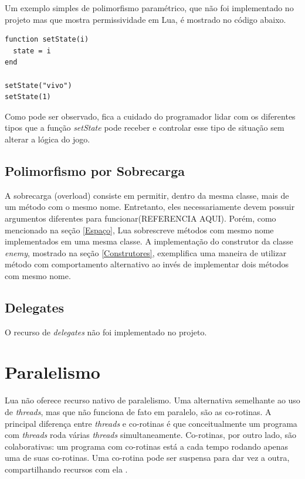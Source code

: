 \documentclass[rel_mlp]{iiufrgs}
\begin{document}
Um exemplo simples de polimorfismo paramétrico, que não foi implementado no projeto mas que mostra permissividade em Lua, é mostrado no código abaixo. 

\begin{lstlisting}
function setState(i)
  state = i
end

setState("vivo")
setState(1)
\end{lstlisting}

Como pode ser observado, fica a cuidado do programador lidar com os diferentes tipos que a função \textit{setState} pode receber e controlar esse tipo de situação sem alterar a lógica do jogo.

\section{Polimorfismo por Sobrecarga}

A sobrecarga (overload) consiste em permitir, dentro da mesma classe, mais de um método com o mesmo nome. Entretanto, eles necessariamente devem possuir argumentos diferentes para funcionar(REFERENCIA AQUI). Porém, como mencionado na seção \ref{Espaço}, Lua sobrescreve métodos com mesmo nome implementados em uma mesma classe. A implementação do construtor da classe \textit{enemy}, mostrado na seção \ref{Construtores}, exemplifica uma maneira de utilizar método com comportamento alternativo ao invés de implementar dois métodos com mesmo nome.

\section{Delegates}

O recurso de \textit{delegates} não foi implementado no projeto. 

\chapter{Paralelismo}

Lua não oferece recurso nativo de paralelismo. Uma alternativa semelhante ao uso de \textit{threads}, mas que não funciona de fato em paralelo, são as co-rotinas. A principal diferença entre \textit{threads} e co-rotinas é que conceitualmente um programa com \textit{threads} roda várias \textit{threads} simultaneamente. Co-rotinas, por outro lado, são colaborativas: um programa com co-rotinas está a cada tempo rodando apenas uma de suas co-rotinas. Uma co-rotina pode ser suspensa para dar vez a outra, compartilhando recursos com ela \cite{ManualLua}.
\end{document}
